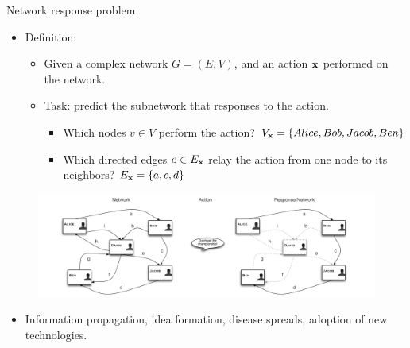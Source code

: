 \documentclass[first=dgreen,second=purple,logo=red]{aaltoslides}
\begin{document}
\begin{frame}{Network response problem}
	\begin{itemize}\footnotesize
		\item Definition:
		\begin{itemize}\footnotesize
			\item Given a complex network $G=(E,V)$, and an action $\mathbf {x}$ performed on the network.
			\item Task: predict the subnetwork that responses to the action.
			\begin{itemize}\footnotesize
				\item Which nodes $v\in V$ perform the action? $V_{\mathbf {x}}=\{Alice,Bob,Jacob,Ben\}$
				\item Which directed edges $e\in E_{\mathbf {x}}$ relay the action from one node to its neighbors? $E_{\mathbf {x}}=\{a,c,d\}$
			\end{itemize}
		\end{itemize}
	\end{itemize}
	\vspace{-10mm}
	\begin{figure}
		\center
		\includegraphics[scale=0.25]{./figures/problem_definition.pdf}
	\end{figure}
	\begin{itemize}
		\item Information propagation, idea formation, disease spreads, adoption of new technologies. 
	\end{itemize}
\end{frame}
\end{document}
